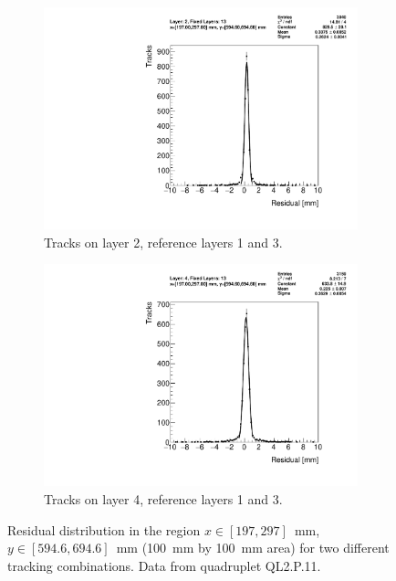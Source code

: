 \begin{figure}
\centering
\begin{subfigure}{.5\textwidth}
  \centering
  \includegraphics[width=\linewidth]{figures/figure_res_dist_QL2P11_3100V_2021-08-05_xbin_12_ybin_7_layer2_fixedlayers13.pdf}
  \caption{Tracks on layer 2, reference layers 1 and 3.}
  \label{fig:res_dist_L2_F13}
\end{subfigure}
\begin{subfigure}{.5\textwidth}
  \centering
  \includegraphics[width=\linewidth]{figures/figure_res_dist_QL2P11_3100V_2021-08-05_xbin_12_ybin_7_layer4_fixedlayers13.pdf}
  \caption{Tracks on layer 4, reference layers 1 and 3.}
  \label{fig:res_dist_L4_F13}
\end{subfigure}
\caption{Residual distribution in the region $x\in\left[197, 297\right]$~mm,  $y\in\left[594.6, 694.6\right]$~mm (\SI{100}{mm} by \SI{100}{mm} area) for two different tracking combinations. Data from quadruplet QL2.P.11.}
\label{fig:res_dist}
\end{figure}

